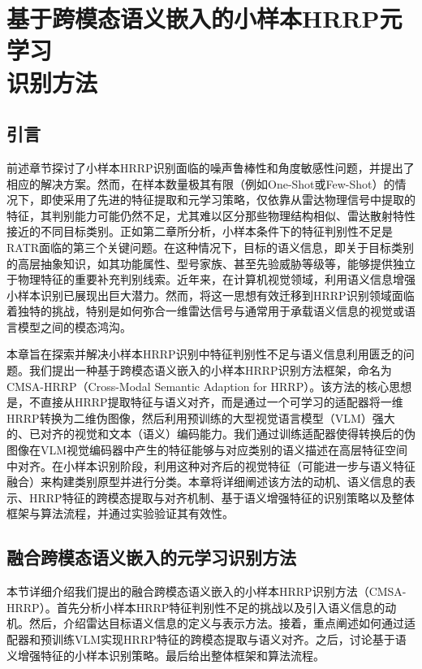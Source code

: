 \chapter{基于跨模态语义嵌入的小样本HRRP元学习\\识别方法}
\label{chap:semantic_fusion}

\section{引言}
\label{sec:semantic_intro}

前述章节探讨了小样本HRRP识别面临的噪声鲁棒性和角度敏感性问题，并提出了相应的解决方案。然而，在样本数量极其有限（例如One-Shot或Few-Shot）的情况下，即使采用了先进的特征提取和元学习策略，仅依靠从雷达物理信号中提取的特征，其判别能力可能仍然不足，尤其难以区分那些物理结构相似、雷达散射特性接近的不同目标类别。正如第二章所分析，小样本条件下的特征判别性不足是RATR面临的第三个关键问题。在这种情况下，目标的语义信息，即关于目标类别的高层抽象知识，如其功能属性、型号家族、甚至先验威胁等级等，能够提供独立于物理特征的重要补充判别线索。近年来，在计算机视觉领域，利用语义信息增强小样本识别已展现出巨大潜力。然而，将这一思想有效迁移到HRRP识别领域面临着独特的挑战，特别是如何弥合一维雷达信号与通常用于承载语义信息的视觉或语言模型之间的模态鸿沟。

本章旨在探索并解决小样本HRRP识别中特征判别性不足与语义信息利用匮乏的问题。我们提出一种基于跨模态语义嵌入的小样本HRRP识别方法框架，命名为CMSA-HRRP（Cross-Modal Semantic Adaption for HRRP）。该方法的核心思想是，不直接从HRRP提取特征与语义对齐，而是通过一个可学习的适配器将一维HRRP转换为二维伪图像，然后利用预训练的大型视觉语言模型（VLM）强大的、已对齐的视觉和文本（语义）编码能力。我们通过训练适配器使得转换后的伪图像在VLM视觉编码器中产生的特征能够与对应类别的语义描述在高层特征空间中对齐。在小样本识别阶段，利用这种对齐后的视觉特征（可能进一步与语义特征融合）来构建类别原型并进行分类。本章将详细阐述该方法的动机、语义信息的表示、HRRP特征的跨模态提取与对齐机制、基于语义增强特征的识别策略以及整体框架与算法流程，并通过实验验证其有效性。

\section{融合跨模态语义嵌入的元学习识别方法}
\label{sec:semantic_method}

本节详细介绍我们提出的融合跨模态语义嵌入的小样本HRRP识别方法（CMSA-HRRP）。首先分析小样本HRRP特征判别性不足的挑战以及引入语义信息的动机。然后，介绍雷达目标语义信息的定义与表示方法。接着，重点阐述如何通过适配器和预训练VLM实现HRRP特征的跨模态提取与语义对齐。之后，讨论基于语义增强特征的小样本识别策略。最后给出整体框架和算法流程。

